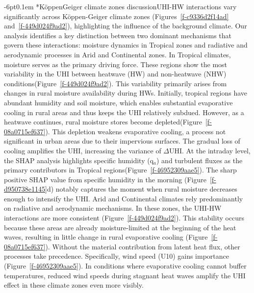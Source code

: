 \documentclass[]{nature}
\makeatletter
\renewcommand{\subsection}{\@startsection {subsection}{2}{0pt}%
    {-6pt}{0.1em}%
    {\fontsize{12pt}{14pt}\selectfont\sffamily\bfseries}%
    }
\makeatother
\begin{document}
\subsection*{K{\"{o}}ppen{\textendash}Geiger climate zones discussion}UHI-HW interactions vary significantly across K{\"{o}}ppen-Geiger climate zones (Figures~\ref{f-c9336d2f14ad} and~\ref{f-449d024f9ad2}), highlighting the influence of the background climate. Our analysis identifies a key distinction between two dominant mechanisms that govern these interactions: moisture dynamics in Tropical zones and radiative and aerodynamic processes in Arid and Continental zones. \mbox{}\protect\newline In Tropical climates, moisture serves as the primary driving force. These regions show the most variability in the UHI between heatwave (HW) and non-heatwave (NHW) conditions(Figure~\ref{f-449d024f9ad2}). This variability primarily arises from changes in rural moisture availability during HWs. Initially, tropical regions have abundant humidity and soil moisture, which enables substantial evaporative cooling in rural areas and thus keeps the UHI relatively subdued. However, as a heatwave continues, rural moisture stores become depleted(Figure~\ref{f-08a0715ef637}). This depletion weakens evaporative cooling, a process not significant in urban areas due to their impervious surfaces. The gradual loss of cooling amplifies the UHI, increasing the variance of \ensuremath{\Delta }UHI. At the intraday level, the SHAP analysis highlights specific humidity (q\ensuremath{_{a}}) and turbulent fluxes as the primary contributors in Tropical regions(Figure~\ref{f-46952309aae5}). The sharp positive SHAP value from specific humidity in the morning (Figure~\ref{f-d950738e1145}d) notably captures the moment when rural moisture decreases enough to intensify the UHI. \mbox{}\protect\newline Arid and Continental climates rely predominantly on radiative and aerodynamic mechanisms. In these zones, the UHI-HW interactions are more consistent (Figure~\ref{f-449d024f9ad2}). This stability occurs because these areas are already moisture-limited at the beginning of the heat waves, resulting in little change in rural evaporative cooling (Figure~\ref{f-08a0715ef637}). Without the material contribution from latent heat flux, other processes take precedence. Specifically, wind speed (U10) gains importance (Figure~\ref{f-46952309aae5}). In conditions where evaporative cooling cannot buffer temperatures, reduced wind speeds during stagnant heat waves amplify the UHI effect in these climate zones even more visibly.
\end{document}
